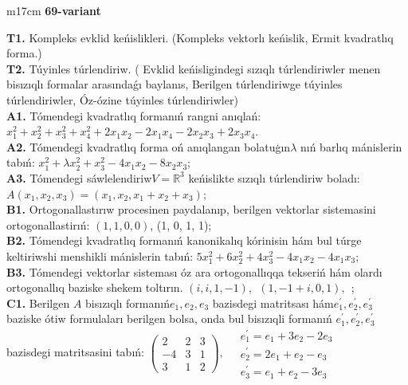 \documentclass{article}
\begin{document}
\begin{tabular}{m{17cm}}
\textbf{69-variant}
\newline

\textbf{T1.} Kompleks evklid keńislikleri.  (Kompleks vektorlı keńislik, Ermit kvadratlıq forma.) \\
\textbf{T2.} Túyinles túrlendiriw. ( Evklid keńisligindegi sızıqlı túrlendiriwler menen bisızıqlı formalar arasındaǵı baylanıs, Berilgen túrlendiriwge túyinles túrlendiriwler, Óz-ózine túyinles túrlendiriwler) \\
\textbf{A1.} Tómendegi kvadratlıq formanıń rangni anıqlań: \(x_{1}^{2} + x_{2}^{2} + x_{3}^{2} + x_{4}^{2} + 2x_{1}x_{2} - 2x_{1}x_{4} - 2x_{2}x_{3} + 2x_{3}x_{4}\). \\
\textbf{A2.} Tómendegi kvadratlıq forma oń anıqlangan bolatuģın\(\lambda\) nıń barlıq mánislerin tabıń: \(x_{1}^{2} + \lambda x_{2}^{2} + x_{3}^{2} - 4x_{1}x_{2} - 8x_{2}x_{3}\); \\
\textbf{A3.} Tómendegi sáwlelendiriw\(V = \mathbb{R}^{3}\) keńislikte sızıqlı túrlendiriw boladı: \(A\left( x_{1},x_{2},x_{3} \right) = \left( x_{1},x_{2},x_{1} + x_{2} + x_{3} \right)\); \\
\textbf{B1.} Ortogonallastırıw procesinen paydalanıp, berilgen vektorlar sistemasini ortogonallastirıń: \((1,1,0,0)\), (1, 0, 1, 1); \\
\textbf{B2.} Tómendegi kvadratlıq formanıń kanonikalıq kórinisin hám bul túrge keltiriwshi menshikli mánislerin tabıń: \(5x_{1}^{2} + 6x_{2}^{2} + 4x_{3}^{2} - 4x_{1}x_{2} - 4x_{1}x_{3}\); \\
\textbf{B3.} Tómendegi vektorlar sisteması óz ara ortogonallıqqa tekseriń hám olardı ortogonallıq baziske shekem toltırın. \((i,i,1, - 1),\ \ (1, - 1 + i,0,1),\ \ \); \\
\textbf{C1.} Berilgen \(A\) bisızıqlı formanıń\(e_{1},e_{2},e_{3}\) bazisdegi matritsası hám\(e_{1}^{'},e_{2}^{'},e_{3}^{'}\) baziske ótiw formulaları berilgen bolsa, onda bul bisızıqli formanıń \(e_{1}^{'},e_{2}^{'},e_{3}^{'}\) bazisdegi matritsasini tabıń: \(\begin{pmatrix} 2 & 2 & 3 \\  - 4 & 3 & 1 \\ 3 & 1 & 2 \end{pmatrix},\ \begin{matrix}  & e_{1}^{'} = e_{1} + 3e_{2} - 2e_{3} \\  & e_{2}^{'} = 2e_{1} + e_{2} - e_{3} \\  & e_{3}^{'} = e_{1} + e_{2} - 3e_{3} \end{matrix}\) \\

\end{tabular}
\end{document}
